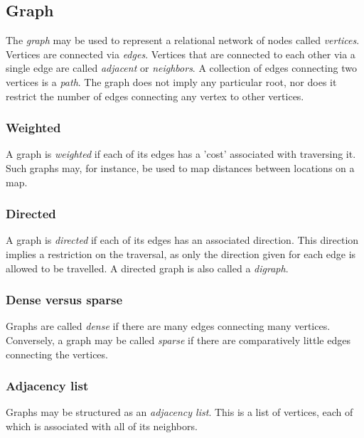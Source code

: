 \documentclass{article}
\begin{document}
\newpage


\subsection{Graph}
The {\em graph} may be used to represent a relational network of nodes called {\em vertices}.
Vertices are connected via {\em edges}. Vertices that are connected to each other via a single edge are called
{\em adjacent} or {\em neighbors}. A collection of edges connecting two vertices is a {\em path}. The graph does
not imply any particular root, nor does it restrict the number of edges connecting any vertex to other vertices.

\subsubsection{Weighted}
A graph is {\em weighted} if each of its edges has a 'cost' associated with traversing it.
Such graphs may, for instance, be used to map distances between locations on a map.

\subsubsection{Directed}
A graph is {\em directed} if each of its edges has an associated direction. This direction implies a restriction
on the traversal, as only the direction given for each edge is allowed to be travelled. A directed graph is also
called a {\em digraph}.

\subsubsection{Dense versus sparse}
Graphs are called {\em dense} if there are many edges connecting many vertices.
Conversely, a graph may be called {\em sparse} if there are comparatively little edges connecting the vertices.

\subsubsection{Adjacency list}
Graphs may be structured as an {\em adjacency list}. This is a list of vertices, each of which is associated with
all of its neighbors.
\end{document}
